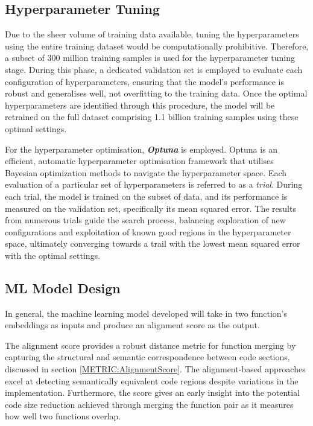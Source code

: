 \subsection{Hyperparameter Tuning} \label{subsubsection:HyperparameterTuning}
Due to the sheer volume of training data available, tuning the hyperparameters using the entire training dataset would be computationally prohibitive. Therefore, a subset of 300 million training samples is used for the hyperparameter tuning stage. During this phase, a dedicated validation set is employed to evaluate each configuration of hyperparameters, ensuring that the model’s performance is robust and generalises well, not overfitting to the training data. Once the optimal hyperparameters are identified through this procedure, the model will be retrained on the full dataset comprising 1.1 billion training samples using these optimal settings.

For the hyperparameter optimisation, \textbf{\textit{Optuna}} is employed. Optuna is an efficient, automatic hyperparameter optimisation framework that utilises Bayesian optimization methods to navigate the hyperparameter space. Each evaluation of a particular set of hyperparameters is referred to as a \emph{trial}. During each trial, the model is trained on the subset of data, and its performance is measured on the validation set, specifically its mean squared error. The results from numerous trials guide the search process, balancing exploration of new configurations and exploitation of known good regions in the hyperparameter space, ultimately converging towards a trail with the lowest mean squared error with the optimal settings.

\subsection{ML Model Design}
In general, the machine learning model developed will take in two function's embeddings as inputs and produce an alignment score as the output.

The alignment score provides a robust distance metric for function merging by capturing the structural and semantic correspondence between code sections, discussed in section \ref{METRIC:AlignmentScore}. The alignment-based approaches excel at detecting semantically equivalent code regions despite variations in the implementation. Furthermore, the score gives an early insight into the potential code size reduction achieved through merging the function pair as it measures how well two functions overlap. 


